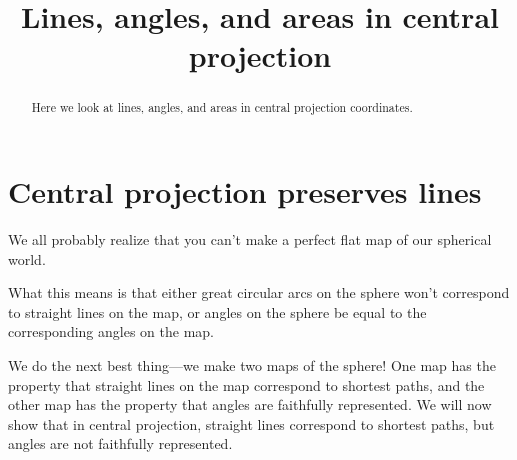 \documentclass{ximera}
\title{Lines, angles, and areas in central projection}
\begin{document}
\begin{abstract}
  Here we look at lines, angles, and areas in central projection coordinates. 
\end{abstract}
\maketitle

\section{Central projection preserves lines}

We all probably realize that you can't make a perfect flat map of our
spherical world.

What this means is that either great circular arcs on the sphere won't
correspond to straight lines on the map, or angles on the sphere be
equal to the corresponding angles on the map.

We do the next best thing---we make two maps of the sphere!  One map
has the property that straight lines on the map correspond to shortest
paths, and the other map has the property that angles are faithfully
represented. We will now show that in central projection, straight
lines correspond to shortest paths, but angles are not faithfully
represented.
\end{document}
